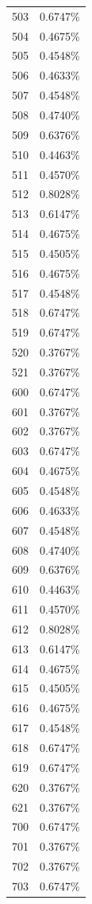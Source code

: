 \documentclass[
  14pt,
]{book}
\begin{document}
\begin{longtable}[]{@{}ll@{}}
503 & 0.6747\% \\
504 & 0.4675\% \\
505 & 0.4548\% \\
506 & 0.4633\% \\
507 & 0.4548\% \\
508 & 0.4740\% \\
509 & 0.6376\% \\
510 & 0.4463\% \\
511 & 0.4570\% \\
512 & 0.8028\% \\
513 & 0.6147\% \\
514 & 0.4675\% \\
515 & 0.4505\% \\
516 & 0.4675\% \\
517 & 0.4548\% \\
518 & 0.6747\% \\
519 & 0.6747\% \\
520 & 0.3767\% \\
521 & 0.3767\% \\
600 & 0.6747\% \\
601 & 0.3767\% \\
602 & 0.3767\% \\
603 & 0.6747\% \\
604 & 0.4675\% \\
605 & 0.4548\% \\
606 & 0.4633\% \\
607 & 0.4548\% \\
608 & 0.4740\% \\
609 & 0.6376\% \\
610 & 0.4463\% \\
611 & 0.4570\% \\
612 & 0.8028\% \\
613 & 0.6147\% \\
614 & 0.4675\% \\
615 & 0.4505\% \\
616 & 0.4675\% \\
617 & 0.4548\% \\
618 & 0.6747\% \\
619 & 0.6747\% \\
620 & 0.3767\% \\
621 & 0.3767\% \\
700 & 0.6747\% \\
701 & 0.3767\% \\
702 & 0.3767\% \\
703 & 0.6747\% \\

\end{longtable}
\end{document}
